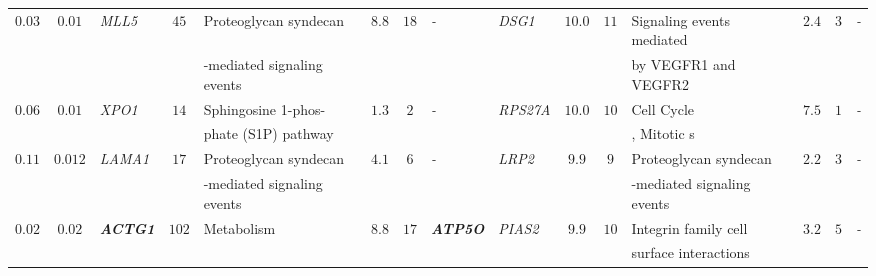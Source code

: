 \documentclass[10pt]{article}
\begin{document}
{\begin{landscape}
\begin{table}[!htbp]
{\begin{tabular}{c c l c l c c l |l c c l c c l}
$0.03$ & $0.01$ & \textit{MLL5} & $45$ & Proteoglycan syndecan & $8.8$ & $18$&\textit{-} & \textit{DSG1} & $10.0$ & $11$ & Signaling events mediated & $2.4$ & $3$ & \textit{-} \tabularnewline

&&&&  -mediated signaling events  &&&&&&&  by VEGFR1 and VEGFR2 &&&\tabularnewline

$0.06$ & $0.01$ & \textit{XPO1} & $14$ & Sphingosine 1-phos- & $1.3$ & $2$&\textit{-} & \textit{RPS27A} & $10.0$ & $10$ & Cell Cycle & $7.5$ & $1$ & \textit{-} \tabularnewline


&&&& phate (S1P) pathway  &&&&&&& , Mitotic s&&&\tabularnewline

$0.11$ & $0.012$ & \textit{LAMA1} & $17$ & Proteoglycan syndecan & $4.1$ & $6$ & \textit{-} & \textit{LRP2} & $9.9$ & $9$ & Proteoglycan syndecan & $2.2$ & $3$ &\textit{-} \tabularnewline

&&&& -mediated signaling events &&&&&&& -mediated signaling events &&&\tabularnewline

$0.02$ & $0.02$ & \textbf{\textit{ACTG1}} & $102$ & Metabolism & $8.8$ & $17$ & \textbf{\textit{ATP5O}} & \textit{PIAS2} & $9.9$ & $10$ & Integrin family cell & $3.2$ & $5$ & \textit{-} \tabularnewline

&&&&  &&&&&&& surface interactions &&&\tabularnewline

\end{tabular}}
\label{tab:path}
\end{table}
\end{landscape}

\newpage

}
\end{document}
